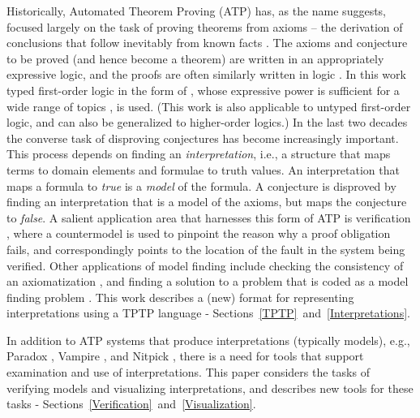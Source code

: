 \documentclass[letterpaper]{article}
\begin{document}
Historically, Automated Theorem Proving (ATP) has, as the name suggests, focused largely on the
task of proving theorems from axioms -- the derivation of conclusions that follow inevitably 
from known facts \cite{RV01-HAR}.
The axioms and conjecture to be proved (and hence become a theorem) are written in an 
appropriately expressive logic, and the proofs are often similarly written in logic \cite{SS+06}.
In this work typed first-order logic in the form of \cite{Wal83,Sch85,Coh87},
whose expressive power is sufficient for a wide range of topics \cite{Sut17}, is used.
(This work is also applicable to untyped first-order logic,
and can also be generalized to higher-order logics.)
In the last two decades the converse task of disproving conjectures
has become increasingly important.
This process depends on finding an {\em interpretation}, i.e., a structure that maps terms 
to domain elements and formulae to truth values.
An interpretation that maps a formula to {\em true} is a {\em model} of the formula.
A conjecture is disproved by finding an interpretation that is a model of the axioms, but 
maps the conjecture to {\em false}.
A salient application area that harnesses this form of ATP is verification \cite{DKW08},
where a countermodel is used to pinpoint the reason why a proof obligation fails, and
correspondingly points to the location of the fault in the system being verified.
Other applications of model finding include checking the consistency of an axiomatization 
\cite{SS+17}, and finding a solution to a problem that is coded as a model finding problem 
\cite{Win82}.
This work describes a (new) format for representing interpretations using a TPTP language -
Sections~\ref{TPTP}~and~\ref{Interpretations}.

In addition to ATP systems that produce interpretations (typically models),
e.g., Paradox \cite{CS03}, Vampire \cite{KV13}, and Nitpick \cite{BN10-ITP},
there is a need for tools that support examination and use of interpretations.
This paper considers the tasks of verifying models and visualizing interpretations, and describes 
new tools for these tasks - Sections~\ref{Verification}~and~\ref{Visualization}.
\end{document}
